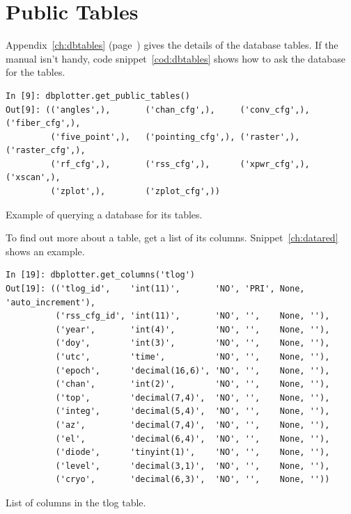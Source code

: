 \documentclass[letterpaper,11pt]{report}
\begin{document}
\section{Public Tables}

Appendix~\ref{ch:dbtables} (page~\pageref{ch:dbtables}) gives the details of
the database tables.  If the manual isn't handy, code snippet~\ref{cod:dbtables}
shows how to ask the database for the tables.
\begin{code}[h!tb]
    \begin{center}
        {\scriptsize \begin{verbatim}
In [9]: dbplotter.get_public_tables()
Out[9]: (('angles',),       ('chan_cfg',),     ('conv_cfg',),   ('fiber_cfg',),
         ('five_point',),   ('pointing_cfg',), ('raster',),     ('raster_cfg',),
         ('rf_cfg',),       ('rss_cfg',),      ('xpwr_cfg',),   ('xscan',),
         ('zplot',),        ('zplot_cfg',))\end{verbatim}
        }\caption{\label{cod:dbtables}Example of querying a database for its
        tables.}
    \end{center}
\end{code}
To find out more about a table, get a list of its columns. Snippet~\ref{ch:datared}
shows an example.
\begin{code}[h!tb]
    \begin{center}
        {\scriptsize \begin{verbatim}
In [19]: dbplotter.get_columns('tlog')
Out[19]: (('tlog_id',    'int(11)',       'NO', 'PRI', None, 'auto_increment'),
          ('rss_cfg_id', 'int(11)',       'NO', '',    None, ''),
          ('year',       'int(4)',        'NO', '',    None, ''),
          ('doy',        'int(3)',        'NO', '',    None, ''),
          ('utc',        'time',          'NO', '',    None, ''),
          ('epoch',      'decimal(16,6)', 'NO', '',    None, ''),
          ('chan',       'int(2)',        'NO', '',    None, ''),
          ('top',        'decimal(7,4)',  'NO', '',    None, ''),
          ('integ',      'decimal(5,4)',  'NO', '',    None, ''),
          ('az',         'decimal(7,4)',  'NO', '',    None, ''),
          ('el',         'decimal(6,4)',  'NO', '',    None, ''),
          ('diode',      'tinyint(1)',    'NO', '',    None, ''),
          ('level',      'decimal(3,1)',  'NO', '',    None, ''),
          ('cryo',       'decimal(6,3)',  'NO', '',    None, ''))\end{verbatim}
        }\caption{\label{cod:tlogcols}List of columns in the {\ttfamily tlog}
        table.}
    \end{center}
\end{code}
\end{document}
